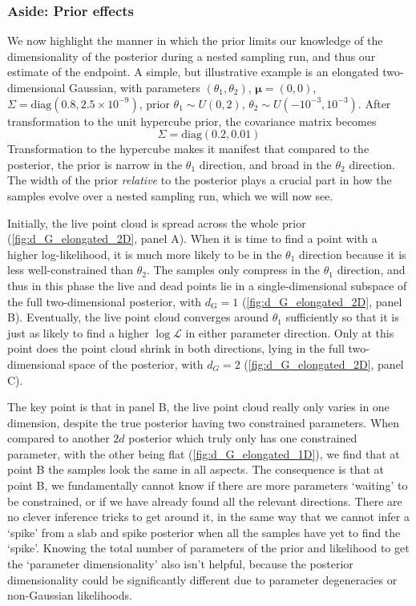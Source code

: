 \documentclass[usenatbib]{mnras}
\newcommand{\Like}{\mathcal{L}}
\newcommand{\dG}{d_\mathrm{G}}
\begin{document}
\subsubsection*{Aside: Prior effects}\label{sec:prior_effects}
We now highlight the manner in which the prior limits our knowledge of the dimensionality of the posterior during a nested sampling run, and thus our estimate of the endpoint. A simple, but illustrative example is an elongated two-dimensional Gaussian, with parameters $(\theta_1, \theta_2)$, $\bm{\mu} = (0, 0)$, $\Sigma = \mathrm{diag}(0.8, 2.5\times10^{-9})$, prior $\theta_1 \sim U(0, 2)$, $\theta_2\sim U(-10^{-3}, 10^{-3})$. After transformation to the unit hypercube prior, the covariance matrix becomes
\begin{equation}
    \Sigma = \mathrm{diag}(0.2, 0.01)
\end{equation}
Transformation to the hypercube makes it manifest that compared to the posterior, the prior is narrow in the $\theta_1$ direction, and broad in the $\theta_2$ direction. The width of the prior \textit{relative} to the posterior plays a crucial part in how the samples evolve over a nested sampling run, which we will now see.
\par
Initially, the live point cloud is spread across the whole prior (\cref{fig:d_G_elongated_2D}, panel A). When it is time to find a point with a higher log-likelihood, it is much more likely to be in the $\theta_1$ direction because it is less well-constrained than $\theta_2$. The samples only compress in the  $\theta_1$ direction, and thus in this phase the live and dead points lie in a single-dimensional subspace of the full two-dimensional posterior, with $\dG = 1$ (\cref{fig:d_G_elongated_2D}, panel B). Eventually, the live point cloud converges around $\theta_1$ sufficiently so that it is just as likely to find a higher $\log\Like$ in either parameter direction. Only at this point does the point cloud shrink in both directions, lying in the full two-dimensional space of the posterior, with $d_G = 2$ (\cref{fig:d_G_elongated_2D}, panel C). 
\par
The key point is that in panel B, the live point cloud really only varies in one dimension, despite the true posterior having two constrained parameters. When compared to another $2d$ posterior which truly only has one constrained parameter, with the other being flat (\cref{fig:d_G_elongated_1D}), we find that at point B the samples look the same in all aspects. The consequence is that at point B, we fundamentally cannot know if there are more parameters `waiting' to be constrained, or if we have already found all the relevant directions. There are no clever inference tricks to get around it, in the same way that we cannot infer a `spike' from a slab and spike posterior when all the samples have yet to find the `spike'. Knowing the total number of parameters of the prior and likelihood to get the `parameter dimensionality' also isn't helpful, because the posterior dimensionality could be significantly different due to parameter degeneracies or non-Gaussian likelihoods.
\end{document}
